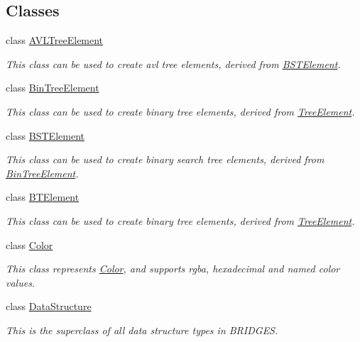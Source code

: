 \subsection*{Classes}
\begin{DoxyCompactItemize}
\item 
class \hyperlink{classbridges_1_1_a_v_l_tree_element}{A\+V\+L\+Tree\+Element}
\begin{DoxyCompactList}\small\item\em This class can be used to create avl tree elements, derived from \hyperlink{classbridges_1_1_b_s_t_element}{B\+S\+T\+Element}. \end{DoxyCompactList}\item 
class \hyperlink{classbridges_1_1_bin_tree_element}{Bin\+Tree\+Element}
\begin{DoxyCompactList}\small\item\em This class can be used to create binary tree elements, derived from \hyperlink{classbridges_1_1_tree_element}{Tree\+Element}. \end{DoxyCompactList}\item 
class \hyperlink{classbridges_1_1_b_s_t_element}{B\+S\+T\+Element}
\begin{DoxyCompactList}\small\item\em This class can be used to create binary search tree elements, derived from \hyperlink{classbridges_1_1_bin_tree_element}{Bin\+Tree\+Element}. \end{DoxyCompactList}\item 
class \hyperlink{classbridges_1_1_b_t_element}{B\+T\+Element}
\begin{DoxyCompactList}\small\item\em This class can be used to create binary tree elements, derived from \hyperlink{classbridges_1_1_tree_element}{Tree\+Element}. \end{DoxyCompactList}\item 
class \hyperlink{classbridges_1_1_color}{Color}
\begin{DoxyCompactList}\small\item\em This class represents \hyperlink{classbridges_1_1_color}{Color}, and supports rgba, hexadecimal and named color values. \end{DoxyCompactList}\item 
class \hyperlink{classbridges_1_1_data_structure}{Data\+Structure}
\begin{DoxyCompactList}\small\item\em This is the superclass of all data structure types in B\+R\+I\+D\+G\+E\+S. \end{DoxyCompactList}\item 

\end{DoxyCompactItemize}
